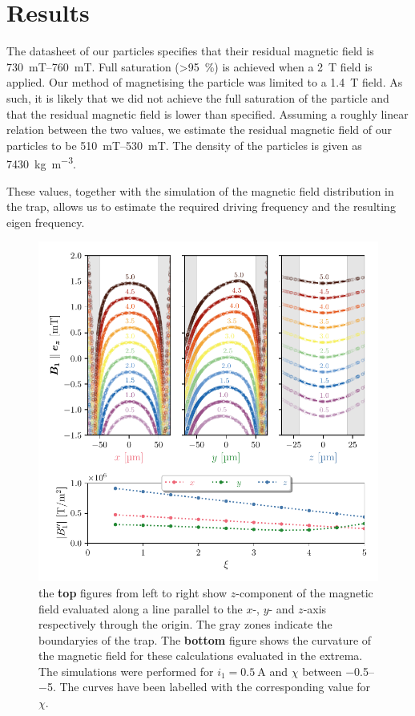 \chapter{Results}
\label{chap:results}
The datasheet of our  particles specifies that their residual magnetic field is \qtyrange{730}{760}{\milli\tesla}. Full saturation (\qty{>95}{\percent}) is achieved when a \qty{2}{\tesla} field is applied. Our method of magnetising the particle was limited to a \qty{1.4}{\tesla} field. As such, it is likely that we did not achieve the full saturation of the particle and that the residual magnetic field is lower than specified. Assuming a roughly linear relation between the two values, we estimate the residual magnetic field of our particles to be \qtyrange{510}{530}{\milli\tesla}. The density of the particles is given as \qty{7430}{\kilo\gram\per\cubic\meter}.

These values, together with the simulation of the magnetic field distribution in the trap, allows us to estimate the required driving frequency and the resulting eigen frequency.

\begin{figure}
    \centering
    \includegraphics{figures/data/magnetic_field_curvature.pdf}
    \caption{the \textbf{top} figures from left to right show $z$-component of the magnetic field evaluated along a line parallel to the $x$-, $y$- and $z$-axis respectively through the origin. The gray zones indicate the boundaryies of the trap. The \textbf{bottom} figure shows the curvature of the magnetic field for these calculations evaluated in the extrema. The simulations were performed for $i_1=\qty{0.5}{\ampere}$ and $\chi$ between \numrange{-0.5}{-5}. The curves have been labelled with the corresponding value for $\chi$.}
    \label{fig:magnetic-field-curvature}
\end{figure}

